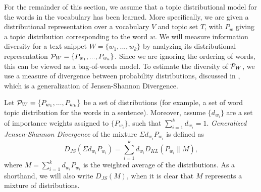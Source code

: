 
For the remainder of this section, we assume that a topic distributional 
model for the words in the vocabulary has been learned. More specifically,  
we are given a distributional representation over a vocabulary $V$ and
topic set $T$, with $P_w$ giving a topic distribution corresponding to the
word $w$. We will measure information diversity
for a text snippet $W=\{w_1,...,w_k\}$ by analyzing its 
distributional representation
${\mathcal P}_{W}=\{P_{w_1},...,P_{w_k}\}$. Since we are ignoring the ordering
of words, this can be viewed as a bag-of-words model. To
estimate the diversity of ${\mathcal P}_{W}$, we use a measure of divergence
between probability distributions, discussed in \cite{FugledeTopsoe},
which is a generalization of Jensen-Shannon Divergence.

\bed\label{diversity}
Let ${\mathcal P}_{W}=\{P_{w_1},...,P_{w_k}\}$ be a set of
distributions (for example, a set of word topic distribution for the words in a sentence). Moreover, assume $\{d_{w_i}\}$  are a set of importance weights assigned to $\{P_{w_i}\}$, such that $\sum_{i=1}^kd_{w_i}=1$.
{\em Generalized Jensen-Shannon Divergence} of the mixture
$\Sigma d_{w_i}P_{w_i}$ is defined as
$$D_{JS}(\Sigma d_{w_i}P_{w_i})=\sum_{i=1}^k
d_{w_i}D_{KL}(P_{w_i}\|M),$$
where $M=\sum_{i=1}^kd_{w_i} P_{w_i}$ is the weighted average of the
distributions. As a shorthand, we will also write $D_{JS}(M)$, when
it is clear that $M$ represents a mixture of distributions.
\eed

